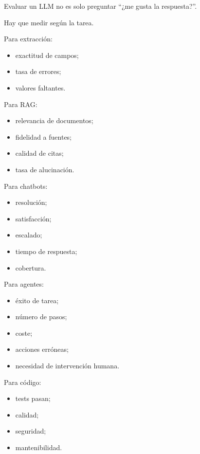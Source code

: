 Evaluar un LLM no es solo preguntar ``¿me gusta la respuesta?''.

Hay que medir según la tarea.

Para extracción:

\begin{itemize}
\tightlist
\item
  exactitud de campos;
\item
  tasa de errores;
\item
  valores faltantes.
\end{itemize}

Para RAG:

\begin{itemize}
\tightlist
\item
  relevancia de documentos;
\item
  fidelidad a fuentes;
\item
  calidad de citas;
\item
  tasa de alucinación.
\end{itemize}

Para chatbots:

\begin{itemize}
\tightlist
\item
  resolución;
\item
  satisfacción;
\item
  escalado;
\item
  tiempo de respuesta;
\item
  cobertura.
\end{itemize}

Para agentes:

\begin{itemize}
\tightlist
\item
  éxito de tarea;
\item
  número de pasos;
\item
  coste;
\item
  acciones erróneas;
\item
  necesidad de intervención humana.
\end{itemize}

Para código:

\begin{itemize}
\tightlist
\item
  tests pasan;
\item
  calidad;
\item
  seguridad;
\item
  mantenibilidad.
\end{itemize}

